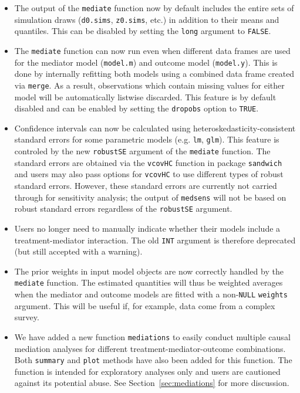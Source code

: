 \documentclass[11pt,letterpaper]{article}
\theoremstyle{plain}
\begin{document}
\begin{itemize}
\item The output of the {\tt mediate} function now by default includes the entire sets of
simulation draws ({\tt d0.sims}, {\tt z0.sims}, etc.) in addition to their means
and quantiles.  This can be disabled by setting the {\tt long} argument to {\tt FALSE}.

\item The {\tt mediate} function can now run even when different data frames are used
for the mediator model ({\tt model.m}) and outcome model ({\tt model.y}).  This is
done by internally refitting both models using a combined data frame created via {\tt merge}.
As a result, observations which contain missing values for either model will be
automatically listwise discarded.  This feature is by default disabled and can be
enabled by setting the {\tt dropobs} option to {\tt TRUE}.

\item Confidence intervals can now be calculated using heteroskedasticity-consistent
standard errors for some parametric models (e.g. {\tt lm}, {\tt glm}).  This
feature is controled by the new {\tt robustSE} argument of the {\tt mediate} function.
The standard errors are obtained via the {\tt vcovHC} function in package {\tt sandwich}
and users may also pass options for {\tt vcovHC} to use different types of
robust standard errors.  However, these standard errors are currently not carried
through for sensitivity analysis; the output of {\tt medsens} will not be based
on robust standard errors regardless of the {\tt robustSE} argument.

\item Users no longer need to manually indicate whether their models include a 
treatment-mediator interaction.  The old {\tt INT} argument is therefore deprecated 
(but still accepted with a warning).

\item The prior weights in input model objects are now correctly handled by
the {\tt mediate} function.  The estimated quantities will thus be weighted averages
when the mediator and outcome models are fitted with a non-{\tt NULL} {\tt weights}
argument. This will be useful if, for example, data come from a complex survey.

\item We have added a new function {\tt mediations} to easily conduct multiple
causal mediation analyses for different treatment-mediator-outcome combinations.
Both {\tt summary} and {\tt plot} methods have also been added for this function.
The function is intended for exploratory analyses only and users are cautioned against
its potential abuse.  See Section~\ref{sec:mediations} for more discussion.

\end{itemize}
\end{document}
